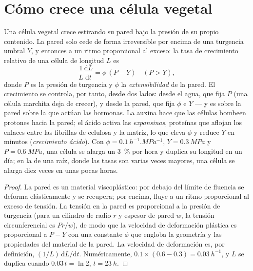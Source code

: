 \section{Cómo crece una célula vegetal}

\begin{theorem}\label{thm:b2:plant-meristems:lockhart}
Una célula vegetal crece estirando su pared bajo la presión de su propio
contenido. La pared solo cede de forma irreversible por encima de una
turgencia umbral $Y$, y entonces a un ritmo proporcional al exceso: la
tasa de crecimiento relativo de una célula de longitud $L$ es
\[
\frac{1}{L}\frac{\mathrm{d}L}{\mathrm{d}t} = \phi\,(P - Y) \quad (P > Y),
\]
donde $P$ es la presión de turgencia y $\phi$ la \emph{extensibilidad} de
la pared. El crecimiento se controla, por tanto, desde dos lados: desde el
agua, que fija $P$ (una célula marchita deja de crecer), y desde la pared,
que fija $\phi$ e $Y$ --- y es sobre la pared sobre la que actúan las
hormonas. La auxina hace que las células bombeen protones hacia la pared;
el ácido activa las \emph{expansinas}, proteínas que aflojan los enlaces
entre las fibrillas de celulosa y la matriz, lo que eleva $\phi$ y reduce
$Y$ en minutos (\emph{crecimiento ácido}). Con $\phi =
\qty{0.1}{h^{-1}.MPa^{-1}}$, $Y = \qty{0.3}{MPa}$ y $P =
\qty{0.6}{MPa}$, una célula se alarga un \qty{3}{\%} por hora y duplica su
longitud en un día; en la  de una raíz, donde las tasas
son varias veces mayores, una célula se alarga diez veces en unas pocas
horas.
\end{theorem}
\begin{proof}
La pared es un material viscoplástico: por debajo del límite de fluencia
se deforma elásticamente y se recupera; por encima, fluye a un ritmo
proporcional al exceso de tensión. La tensión en la pared es proporcional
a la presión de turgencia (para un cilindro de radio $r$ y espesor de
pared $w$, la tensión circunferencial es $Pr/w$), de modo que la velocidad
de deformación plástica es proporcional a $P - Y$ con una constante $\phi$
que engloba la geometría y las propiedades del material de la pared. La
velocidad de deformación es, por definición,
$(1/L)\,\mathrm{d}L/\mathrm{d}t$. Numéricamente,
$0.1\times(0.6 - 0.3) = \qty{0.03}{h^{-1}}$, y $L$ se duplica cuando
$0.03\,t = \ln 2$, $t = \qty{23}{h}$.
\end{proof}

